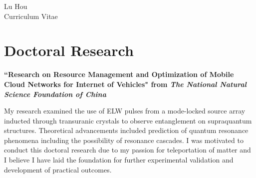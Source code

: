 \documentclass[10pt]{article} %
\begin{document}
\newpage

\begin{paracol}{2} %


\parbox[top][0.12\textheight][c]{\linewidth}{ %
	\vspace{-0.04\textheight} %
	\centering %
	{\Huge Lu Hou}\hspace{1pt} \faMars\\\medskip %
	{\Huge\color{headings}\cvtextfont Curriculum Vitae}
}


\section{Doctoral Research}

{\raggedright\textbf{``Research on Resource Management and Optimization of Mobile Cloud Networks for Internet of Vehicles" from \textit{The National Natural Science Foundation of China}}\\\medskip}

My research examined the use of ELW pulses from a mode-locked source array inducted through transuranic crystals to observe entanglement on supraquantum structures. Theoretical advancements included prediction of quantum resonance phenomena including the possibility of resonance cascades. I was motivated to conduct this doctoral research due to my passion for teleportation of matter and I believe I have laid the foundation for further experimental validation and development of practical outcomes.

\medskip %


\end{paracol}
\end{document}
